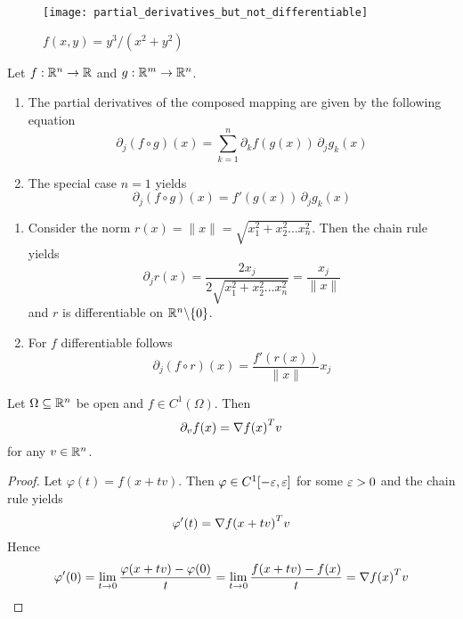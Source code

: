 \begin{figure}[H]
    \centering
    \texttt{[image: partial\_derivatives\_but\_not\_differentiable]}
    \caption{\( f(x,y) = y^3/(x^2 + y^2) \)}\label{fig:partial_derivatives_but_not_differentiable}
\end{figure}
\bigskip


\begin{lemma}
    Let \( f: \mathbb{R}^n \to \mathbb{R} \) and \( g: \mathbb{R}^m \to \mathbb{R}^n \).
    \begin{enumerate}
        \item The partial derivatives of the composed mapping are given by the following equation
              \[
                  \partial_j (f \circ g) (x) = \sum_{k=1}^n \partial_k f(g(x))\,\partial_j g_k(x)
              \]
        \item The special case \( n = 1 \) yields
              \[
                  \partial_j (f \circ g) (x) = f'(g(x))\,\partial_j g_k(x)
              \]
    \end{enumerate}
\end{lemma}
\bigskip


\begin{examples}\hfill
    \begin{enumerate}
        \item Consider the norm \( r(x) = \|x\| = \sqrt{x_1^2 + x_2^2 \dots x_n^2} \). Then the chain rule yields
              \[
                  \partial_j r(x) = \frac{2 x_j}{2 \sqrt{x_1^2 + x_2^2 \dots x_n^2}} = \frac{x_j}{\|x\|}
              \]
              and \( r \) is differentiable on \( \mathbb{R}^n {\setminus} \{ 0 \} \).
        \item For \( f \) differentiable follows
              \[
                  \partial_j (f \circ r)(x) = \frac{f'(r(x))}{\|x\|} x_j
              \]
    \end{enumerate}
\end{examples}
\bigskip


\begin{lemma}\label{lemma:directional_derivative}
    Let \( \Omega \subseteq \mathbb{R}^n \) be open and \( f \in C^1(\Omega) \). Then
    \[
        \partial_v f(x) = \nabla{f(x)}^T v
    \]
    for any \( v \in \mathbb{R}^n \).
\end{lemma}

\begin{proof}
    Let \( \varphi(t) = f(x + tv) \). Then \( \varphi \in C^1[-\varepsilon, \varepsilon ] \) for some \( \varepsilon > 0 \)
    and the chain rule yields
    \[
        \varphi'(t) = {\nabla f(x + tv)}^T v
    \]
    Hence
    \[
        \varphi'(0) = \lim_{t \to 0} \frac{\varphi(x + tv) - \varphi(0)}{t} =
        \lim_{t \to 0} \frac{f(x + tv) - f(x)}{t} = {\nabla f(x)}^T v
    \]
\end{proof}
\bigskip


